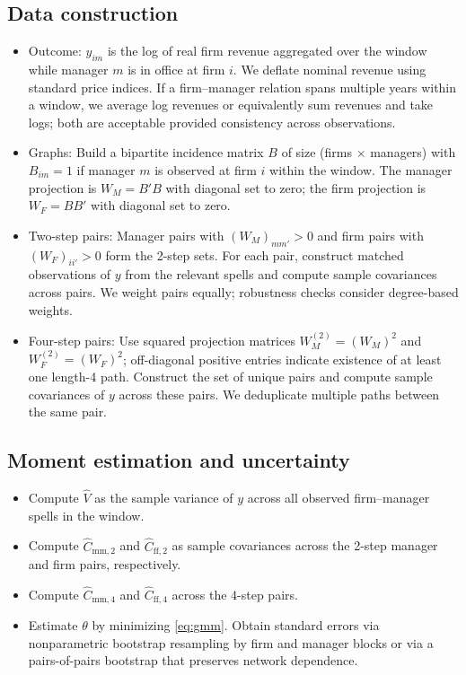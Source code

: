\documentclass[11pt]{article}
\begin{document}
\subsection{Data construction}
\begin{itemize}
  \item Outcome: $y_{im}$ is the log of real firm revenue aggregated over the window while manager $m$ is in office at firm $i$. We deflate nominal revenue using standard price indices. If a firm--manager relation spans multiple years within a window, we average log revenues or equivalently sum revenues and take logs; both are acceptable provided consistency across observations.
  \item Graphs: Build a bipartite incidence matrix $B$ of size (firms $\times$ managers) with $B_{im}=1$ if manager $m$ is observed at firm $i$ within the window. The manager projection is $W_M = B'B$ with diagonal set to zero; the firm projection is $W_F = BB'$ with diagonal set to zero.
  \item Two-step pairs: Manager pairs with $(W_M)_{mm'}>0$ and firm pairs with $(W_F)_{ii'}>0$ form the 2-step sets. For each pair, construct matched observations of $y$ from the relevant spells and compute sample covariances across pairs. We weight pairs equally; robustness checks consider degree-based weights.
  \item Four-step pairs: Use squared projection matrices $W_M^{(2)}=(W_M)^2$ and $W_F^{(2)}=(W_F)^2$; off-diagonal positive entries indicate existence of at least one length-4 path. Construct the set of unique pairs and compute sample covariances of $y$ across these pairs. We deduplicate multiple paths between the same pair.
\end{itemize}

\subsection{Moment estimation and uncertainty}
\begin{itemize}
  \item Compute $\widehat V$ as the sample variance of $y$ across all observed firm--manager spells in the window.
  \item Compute $\widehat C_{\text{mm},2}$ and $\widehat C_{\text{ff},2}$ as sample covariances across the 2-step manager and firm pairs, respectively.
  \item Compute $\widehat C_{\text{mm},4}$ and $\widehat C_{\text{ff},4}$ across the 4-step pairs.
  \item Estimate $\theta$ by minimizing \eqref{eq:gmm}. Obtain standard errors via nonparametric bootstrap resampling by firm and manager blocks or via a pairs-of-pairs bootstrap that preserves network dependence.
\end{itemize}
\end{document}
